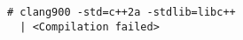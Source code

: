 \begin{lstlisting}[language={},numbers=none,title=\href{https://godbolt.org/z/66exs6}{\texttt{godbolt.org/z/66exs6}}]
# clang900 -std=c++2a -stdlib=libc++
  | <Compilation failed>
\end{lstlisting}
